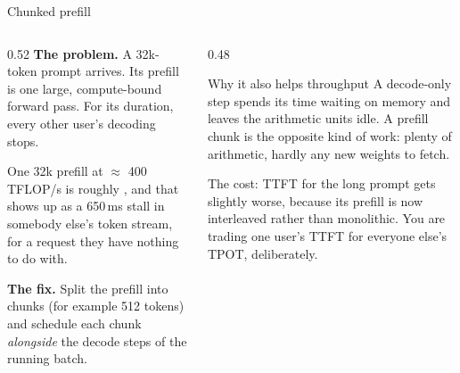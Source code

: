 \documentclass[aspectratio=169,10pt]{beamer}
\begin{document}
\begin{frame}{Chunked prefill}
  \begin{columns}[T]
    \begin{column}{0.52\textwidth}
      \textbf{The problem.} A 32k-token prompt arrives. Its prefill is one
      large, compute-bound forward pass. For its duration, every other user's
      decoding stops.
      \vspace{0.4em}

      One 32k prefill at $\approx$ 400\,TFLOP/s is roughly , and
      that shows up as a 650\,ms stall in somebody else's token stream, for a
      request they have nothing to do with.
      \vspace{0.7em}

      \textbf{The fix.} Split the prefill into chunks (for example 512 tokens)
      and schedule each chunk \emph{alongside} the decode steps of the running
      batch.
    \end{column}
    \begin{column}{0.48\textwidth}
      \begin{block}{Why it also helps throughput}
        \small
        A decode-only step spends its time waiting on memory and leaves the
        arithmetic units idle. A prefill chunk is the opposite kind of work:
        plenty of arithmetic, hardly any new weights to fetch.
        \vspace{0.3em}
      \end{block}
      \vspace{0.2em}
      \small
      The cost: TTFT for the long prompt gets slightly worse, because its
      prefill is now interleaved rather than monolithic. You are trading one
      user's TTFT for everyone else's TPOT, deliberately.
    \end{column}
  \end{columns}
\end{frame}
\end{document}
